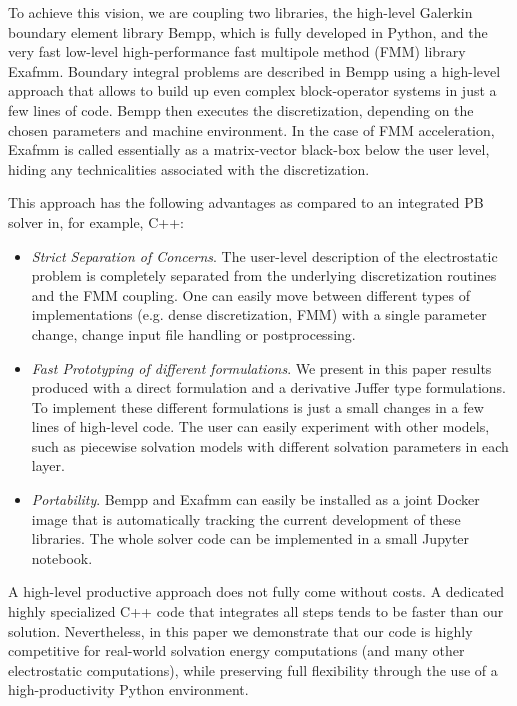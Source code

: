 To achieve this vision, we are coupling two libraries, the high-level Galerkin boundary element library Bempp, which is fully developed in Python, and the very fast low-level high-performance fast multipole method (FMM) library Exafmm. 
Boundary integral problems are described in Bempp using a high-level approach that allows to build up even complex block-operator systems in just a few lines of code. Bempp then executes the discretization, depending on the chosen parameters and machine environment. In the case of FMM acceleration, Exafmm is called essentially as a matrix-vector black-box below the user level, hiding any technicalities associated with the discretization.

This approach has the following advantages as compared to an integrated PB solver in, for example, C++:
\begin{itemize}
	\item \textit{Strict Separation of Concerns}. The user-level description of the electrostatic problem is completely separated from the underlying discretization routines and the FMM coupling. One can easily move between different types of implementations (e.g. dense discretization, FMM) with a single parameter change, change input file handling or postprocessing.
	\item \textit{Fast Prototyping of different formulations}. We present in this paper results produced with a direct formulation and a derivative Juffer type formulations. To implement these different formulations is just a small changes in a few lines of high-level code. The user can easily experiment with other models, such as piecewise solvation models with different solvation parameters in each layer.
	\item \textit{Portability}. Bempp and Exafmm can easily be installed as a joint Docker image that is automatically tracking the current development of these libraries. The whole solver code can be implemented in a small Jupyter notebook.
\end{itemize}
A high-level productive approach does not fully come without costs. A dedicated highly specialized C++ code that integrates all steps tends to be faster than our solution. Nevertheless, in this paper we demonstrate that our code is highly competitive for real-world solvation energy computations (and many other electrostatic computations), while preserving full flexibility through the use of a high-productivity Python environment.



